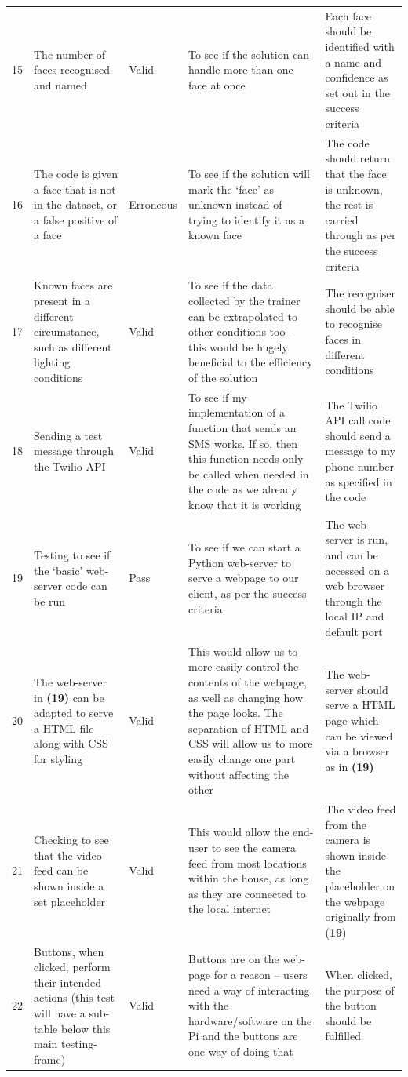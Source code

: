 \documentclass[9pt]{article}
\begin{document}
\begin{tabularx}{\textwidth}{lXlXX}
	15 & The number of faces recognised and named & Valid & To see if the solution can handle more than one face at once & Each face should be identified with a name and confidence as set out in the success criteria	\\
	16 & The code is given a face that is not in the dataset, or a false positive of a face & Erroneous & To see if the solution will mark the `face' as unknown instead of trying to identify it as a known face & The code should return that the face is unknown, the rest is carried through as per the success criteria \\
	17 & Known faces are present in a different circumstance, such as different lighting conditions & Valid & To see if the data collected by the trainer can be extrapolated to other conditions too -- this would be hugely beneficial to the efficiency of the solution & The recogniser should be able to recognise faces in different conditions \\
	18 & Sending a test message through the Twilio API & Valid & To see if my implementation of a function that sends an SMS works. If so, then this function needs only be called when needed in the code as we already know that it is working & The Twilio API call code should send a message to my phone number as specified in the code\\
	19 & Testing to see if the `basic' web-server code can be run & Pass & To see if we can start a Python web-server to serve a webpage to our client, as per the success criteria & The web server is run, and can be accessed on a web browser through the local IP and default port\\
	20 & The web-server in \textbf{(19)} can be adapted to serve a HTML file along with CSS for styling & Valid & This would allow us to more easily control the contents of the webpage, as well as changing how the page looks. The separation of HTML and CSS will allow us to more easily change one part without affecting the other & The web-server should serve a HTML page which can be viewed via a browser as in \textbf{(19)}\\
	21 & Checking to see that the video feed can be shown inside a set placeholder & Valid & This would allow the end-user to see the camera feed from most locations within the house, as long as they are connected to the local internet & The video feed from the camera is shown inside the placeholder on the webpage originally from (\textbf{19})\\
	22 & Buttons, when clicked, perform their intended actions (this test will have a sub-table below this main testing-frame) & Valid & Buttons are on the web-page for a reason -- users need a way of interacting with the hardware/software on the Pi and the buttons are one way of doing that & When clicked, the purpose of the button should be fulfilled \\

\end{tabularx}
\end{document}
